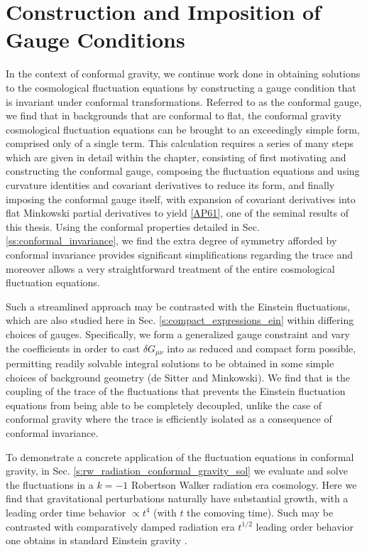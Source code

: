 
\chapter{Construction and Imposition of Gauge Conditions}
\label{c:constructing_gauge_conditions}
In the context of conformal gravity, we continue work done in obtaining solutions to the cosmological fluctuation equations \cite{mannheim_2012} by constructing a gauge condition that is invariant under conformal transformations. Referred to as the conformal gauge, we find that in backgrounds that are conformal to flat, the conformal gravity cosmological fluctuation equations can be brought to an exceedingly simple form, comprised only of a single term. This calculation requires a series of many steps which are given in detail within the chapter, consisting of first motivating and constructing the conformal gauge, composing the fluctuation equations and using curvature identities and covariant derivatives to reduce its form, and finally imposing the conformal gauge itself, with expansion of covariant derivatives into flat Minkowski partial derivatives to yield \eqref{AP61}, one of the seminal results of this thesis. Using the conformal properties detailed in Sec. \ref{ss:conformal_invariance}, we find the extra degree of symmetry afforded by conformal invariance provides significant simplifications regarding the trace and moreover allows a very straightforward treatment of the entire cosmological fluctuation equations.

Such a streamlined approach may be contrasted with the Einstein fluctuations, which are also studied here in Sec. \ref{s:compact_expressions_ein} within differing choices of gauges. Specifically, we form a generalized gauge constraint and vary the coefficients in order to cast $\delta G_{\mu\nu}$ into as reduced and compact form possible, permitting readily solvable integral solutions to be obtained in some simple choices of background geometry (de Sitter and Minkowski). We find that is the coupling of the trace of the fluctuations that prevents the Einstein fluctuation equations from being able to be completely decoupled, unlike the case of conformal gravity where the trace is efficiently isolated as a consequence of conformal invariance.

To demonstrate a concrete application of the fluctuation equations in conformal gravity, in Sec. \ref{s:rw_radiation_conformal_gravity_sol} we evaluate and solve the fluctuations in a $k=-1$ Robertson Walker radiation era cosmology. Here we find that gravitational perturbations naturally have substantial growth, with a leading order time behavior $\propto t^4$ (with $t$ the comoving time). Such may be contrasted with comparatively damped radiation era $t^{1/2}$ leading order behavior one obtains in standard Einstein gravity \cite{weinberg_2008}.

